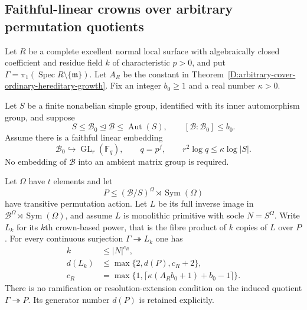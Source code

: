 \subsection{Faithful-linear crowns over arbitrary permutation quotients}

\begin{theorem}
\label{D:arbitrary-quotient-faithful-linear-crowns}
Let $R$ be a complete excellent normal local surface with
algebraically closed coefficient and residue field $k$ of
characteristic $p>0$, and put
$\Gamma=\pi_1(\operatorname{Spec}R\setminus\{\mathfrak m\})$.
Let $A_R$ be the constant in
Theorem~\ref{D:arbitrary-cover-ordinary-hereditary-growth}.
Fix an integer $b_0\ge1$ and a real number $\kappa>0$.

Let $S$ be a finite nonabelian simple group, identified
with its inner automorphism group, and suppose
\[
 S\le\mathcal B_0\mathrel{\trianglelefteq}\mathcal B
          \le\operatorname{Aut}(S),\qquad
 [\mathcal B:\mathcal B_0]\le b_0.                       \tag{D.AL.1}
\]
Assume there is a faithful linear embedding
\[
 \mathcal B_0\hookrightarrow\operatorname{GL}_r(\mathbb F_q),
 \qquad q=p^f,\qquad
                   r^2\log q\le\kappa\log|S|.           \tag{D.AL.2}
\]
No embedding of $\mathcal B$ into an ambient matrix group
is required.

Let $\Omega$ have $t$ elements and let
\[
 P\le(\mathcal B/S)^\Omega\rtimes\operatorname{Sym}(\Omega)
                                                        \tag{D.AL.3}
\]
have transitive permutation action. Let $L$ be its full
inverse image in
$\mathcal B^\Omega\rtimes\operatorname{Sym}(\Omega)$,
and assume $L$ is monolithic primitive with socle
$N=S^\Omega$. Write $L_k$ for its $k$th crown-based power,
that is the fibre product of $k$ copies of $L$ over $P$.
For every continuous surjection $\Gamma\twoheadrightarrow L_k$
one has
\[
 \begin{split}
 k&\le |N|^{c_R},\\
 d(L_k)&\le\max\{2,d(P),c_R+2\},\\
 c_R&=\max\{1,\lceil\kappa(A_Rb_0+1)+b_0-1\rceil\}.
 \end{split}                                            \tag{D.AL.4}
\]
There is no ramification or resolution-extension condition
on the induced quotient $\Gamma\twoheadrightarrow P$.
Its generator number $d(P)$ is retained explicitly.


\end{theorem}
